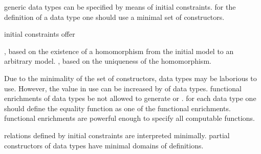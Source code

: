 \documentclass[landscape, autoslides, light]{mmiss}
\newcommand{\ns}{\normalsize}
\begin{document}
\begin{Package}[Label={FSDPT}, Title={Formal Specification of Data and Process Types}, ShortTitle={FSDPT}, Authors={Horst Reichel}, Date={February 2003}, LevelOfDetail=Lecture, Language=en-GB]
\begin{Section}[Title={Summary}, Label={section5}]
\begin{Paragraph}[Title={Data Types}, Label=Paragraph148]
\ns
\begin{List}[ListType=itemize]
    \ListItem generic data types can be specified by means of initial
    constraints.\pause
    \ListItem for the definition of a data type one should use a
    minimal set of constructors.\pause
    \item initial constraints offer \pause \begin{List}[ListType=itemize]
        \ListItem {}, based on the existence of a
        homomorphism from the initial model to an arbitrary
        model.\pause
        \ListItem {}, based on the uniqueness
        of the homomorphism.
    \end{List}
\end{List}\end{Paragraph}
\begin{Paragraph}[Title={Data Types}, Label=Paragraph149]
\begin{List}[ListType=itemize]
    \ListItem Due to the minimality of the set of constructors, data
    types may be laborious to use. However, the value in use can
    be increased by  of data
    types.\pause
    \ListItem functional enrichments of data types be not allowed to
    generate  or .\pause
    \ListItem for each data type one should define the equality
    function as one of the functional enrichments.\pause
    \ListItem functional enrichments are powerful enough to specify
    all computable functions.

\end{List}\end{Paragraph}
\begin{Paragraph}[Title={Data Types}, Label=Paragraph150]
\begin{List}[ListType=itemize]

    \ListItem relations defined by initial constraints are interpreted
    minimally.\pause
    \ListItem partial constructors of data types have minimal domains
    of definitions.
\end{List}


\end{Paragraph}
\end{Section}
\end{Package}
\end{document}

